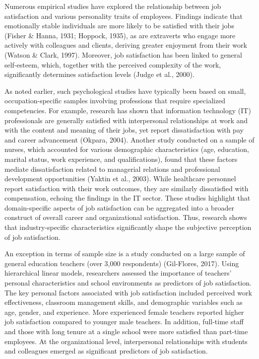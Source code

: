 \documentclass[
]{interact}
\begin{document}
Numerous empirical studies have explored the relationship between job
satisfaction and various personality traits of employees. Findings
indicate that emotionally stable individuals are more likely to be
satisfied with their jobs (Fisher \& Hanna, 1931; Hoppock, 1935), as are
extraverts who engage more actively with colleagues and clients,
deriving greater enjoyment from their work (Watson \& Clark, 1997).
Moreover, job satisfaction has been linked to general self-esteem,
which, together with the perceived complexity of the work, significantly
determines satisfaction levels (Judge et al., 2000).

As noted earlier, such psychological studies have typically been based
on small, occupation-specific samples involving professions that require
specialized competencies. For example, research has shown that
information technology (IT) professionals are generally satisfied with
interpersonal relationships at work and with the content and meaning of
their jobs, yet report dissatisfaction with pay and career advancement
(Okpara, 2004). Another study conducted on a sample of nurses, which
accounted for various demographic characteristics (age, education,
marital status, work experience, and qualifications), found that these
factors mediate dissatisfaction related to managerial relations and
professional development opportunities (Yaktin et al., 2003). While
healthcare personnel report satisfaction with their work outcomes, they
are similarly dissatisfied with compensation, echoing the findings in
the IT sector. These studies highlight that domain-specific aspects of
job satisfaction can be aggregated into a broader construct of overall
career and organizational satisfaction. Thus, research shows that
industry-specific characteristics significantly shape the subjective
perception of job satisfaction.

An exception in terms of sample size is a study conducted on a large
sample of general education teachers (over 3,000 respondents)
(Gil-Flores, 2017). Using hierarchical linear models, researchers
assessed the importance of teachers' personal characteristics and school
environments as predictors of job satisfaction. The key personal factors
associated with job satisfaction included perceived work effectiveness,
classroom management skills, and demographic variables such as age,
gender, and experience. More experienced female teachers reported higher
job satisfaction compared to younger male teachers. In addition,
full-time staff and those with long tenure at a single school were more
satisfied than part-time employees. At the organizational level,
interpersonal relationships with students and colleagues emerged as
significant predictors of job satisfaction.
\end{document}
